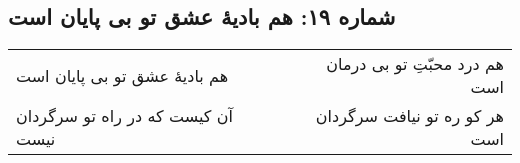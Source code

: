 \begin{center}
\section*{شماره ۱۹: هم بادیۀ عشق تو بی پایان است}
\label{sec:019}
\begin{longtable}{l p{0.5cm} r}
هم بادیهٔ عشق تو بی پایان است
&&
هم درد محبّتِ تو بی درمان است
\\
آن کیست که در راه تو سرگردان نیست
&&
هر کو ره تو نیافت سرگردان است
\\
\end{longtable}
\end{center}
